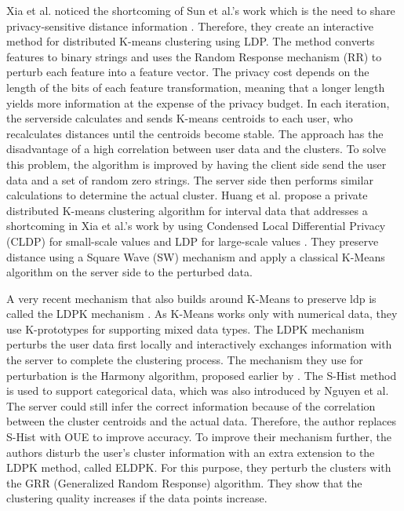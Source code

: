 Xia et al. noticed the shortcoming of Sun et al.'s work which is the need to share privacy-sensitive distance information \citep{xia_distributed_2020}.
Therefore, they create an interactive method for distributed K-means clustering using LDP.
The method converts features to binary strings and uses the Random Response mechanism (RR) to perturb each feature into a feature vector.
The privacy cost depends on the length of the bits of each feature transformation, meaning that a longer length yields more information at the expense of the privacy budget.
In each iteration, the serverside calculates and sends K-means centroids to each user, who recalculates distances until the centroids become stable.
The approach has the disadvantage of a high correlation between user data and the clusters.
To solve this problem, the algorithm is improved by having the client side send the user data and a set of random zero strings.
The server side then performs similar calculations to determine the actual cluster.
Huang et al. propose a private distributed K-means clustering algorithm for interval data that addresses a shortcoming  in Xia et al.'s work by using Condensed Local Differential Privacy (CLDP) for small-scale values and LDP for large-scale values \citep{9679364}.
They preserve distance using a Square Wave (SW) mechanism and apply a classical K-Means algorithm on the server side to the perturbed data.

A very recent mechanism that also builds around K-Means to preserve \gls{ldp} is called the LDPK mechanism \citep{yuan_privacypreserving_2021}.
As K-Means works only with numerical data, they use K-prototypes for supporting mixed data types.
The LDPK mechanism perturbs the user data first locally and interactively exchanges information with the server to complete the clustering process.
The mechanism they use for perturbation is the Harmony algorithm, proposed earlier by \citep{nguyen_collecting_2016}.
The S-Hist method is used to support categorical data, which was also introduced by Nguyen et al.
The server could still infer the correct information because of the correlation between the cluster centroids and the actual data.
Therefore, the author replaces S-Hist with OUE \citep{wang_locally_nodate} to improve accuracy.
To improve their mechanism further, the authors disturb the user’s cluster information with an extra extension to the LDPK method, called ELDPK.
For this purpose, they perturb the clusters with the GRR (Generalized Random Response) algorithm.
They show that the clustering quality increases if the data points increase. \newline

